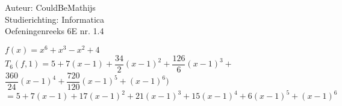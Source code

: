 \documentclass[a4paper]{article}
\begin{document}
  
\noindent \large Auteur: CouldBeMathijs \\
\noindent \large Studierichting: Informatica\\
\noindent \large Oefeningenreeks 6E nr. 1.4\\

\medskip

\normalsize
$f(x) = x^6 + x^3 - x^2 + 4$\\

$T_6(f, 1) = 5 + 7(x-1) + \dfrac{34}{2} (x-1)^2 + \dfrac{126}{6}(x-1)^3 + $\\

$\dfrac{360}{24}(x-1)^4 + \dfrac{720}{120} (x-1)^5 + (x-1)^6)$\\

$ = 5 + 7(x-1) + 17(x-1)^2 + 21(x-1)^3 + 15(x-1)^4 + 6(x-1)^5 + (x-1)^6$



\begin{thebibliography}{999}
\end{thebibliography}
\end{document}
